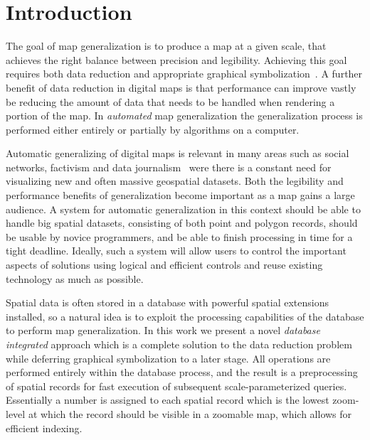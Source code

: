 \section{Introduction}





The goal of map generalization is to produce a map at a given scale, that achieves the right balance between precision and legibility. Achieving this goal requires both data reduction and appropriate graphical symbolization~\cite{brassel1988generalization,gruenreich1985cag}. A further benefit of data reduction in digital maps is that performance can improve vastly be reducing the amount of data that needs to be handled when rendering a portion of the map. In \emph{automated} map generalization the generalization process is performed either entirely or partially by algorithms on a computer.

Automatic generalizing of digital maps is relevant in many areas such as social networks, factivism and data journalism~\cite{cohen2011journalism,bono,sankaranarayanan2009twitterstand} were there is a constant need for visualizing new and often massive geospatial datasets. Both the legibility and performance benefits of generalization become important as a map gains a large audience. A system for automatic generalization in this context should be able to handle big spatial datasets, consisting of both point and polygon records, should be usable by novice programmers, and be able to finish processing in time for a tight deadline. Ideally, such a system will allow users to control the important aspects of solutions using logical and efficient controls and reuse existing technology as much as possible.

Spatial data is often stored in a database with powerful spatial extensions installed, so a natural idea is to exploit the processing capabilities of the database to perform map generalization. In this work we present a novel \emph{database integrated} approach which is a complete solution to the data reduction problem while deferring graphical symbolization to a later stage. All operations are performed entirely within the database process, and the result is a preprocessing of spatial records for fast execution of subsequent scale-parameterized queries. Essentially a number is assigned to each spatial record which is the lowest zoom-level at which the record should be visible in a zoomable map, which allows for efficient indexing.

